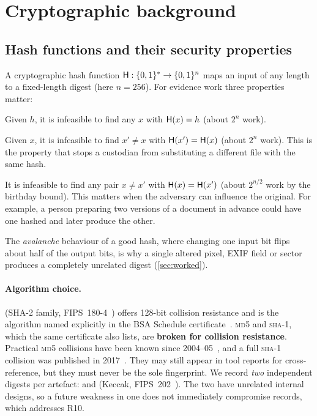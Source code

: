 \section{Cryptographic background}
\label{sec:background}

\subsection{Hash functions and their security properties}
A cryptographic hash function $\mathsf{H} : \{0,1\}^* \to \{0,1\}^n$ maps an input of any length to a fixed-length digest (here $n = 256$). For evidence work three properties matter:
\begin{description}[style=nextline,leftmargin=1.2em]
  \item[Pre-image resistance.] Given $h$, it is infeasible to find any $x$ with $\mathsf{H}(x) = h$ (about $2^{n}$ work).
  \item[Second pre-image resistance.] Given $x$, it is infeasible to find $x' \neq x$ with $\mathsf{H}(x') = \mathsf{H}(x)$ (about $2^{n}$ work). This is the property that stops a custodian from substituting a different file with the same hash.
  \item[Collision resistance.] It is infeasible to find any pair $x \neq x'$ with $\mathsf{H}(x) = \mathsf{H}(x')$ (about $2^{n/2}$ work by the birthday bound). This matters when the adversary can influence the original. For example, a person preparing two versions of a document in advance could have one hashed and later produce the other.
\end{description}
The \emph{avalanche} behaviour of a good hash, where changing one input bit flips about half of the output bits, is why a single altered pixel, EXIF field or sector produces a completely unrelated digest (\cref{sec:worked}).

\paragraph{Algorithm choice.} \shatwo{} (SHA-2 family, FIPS~180-4~\cite{fips180}) offers 128-bit collision resistance and is the algorithm named explicitly in the BSA Schedule certificate~\cite{bsa2023}. \textsc{md5} and \textsc{sha-1}, which the same certificate also lists, are \textbf{broken for collision resistance}. Practical \textsc{md5} collisions have been known since 2004--05~\cite{wang2005}, and a full \textsc{sha-1} collision was published in 2017~\cite{stevens2017}. They may still appear in tool reports for cross-reference, but they must never be the sole fingerprint. We record \emph{two} independent digests per artefact: \shatwo{} and \shathree{} (Keccak, FIPS~202~\cite{fips202}). The two have unrelated internal designs, so a future weakness in one does not immediately compromise records, which addresses R10.


